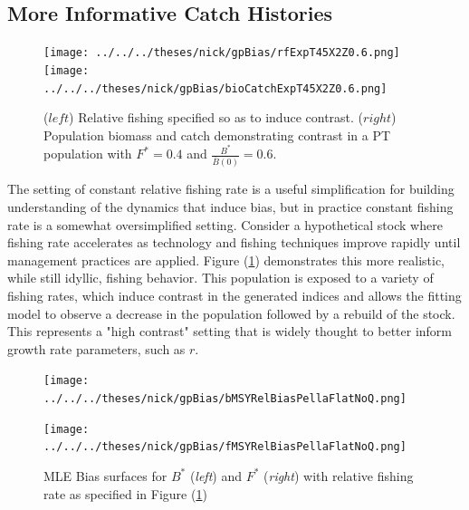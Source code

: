 \documentclass[12pt]{article}
\begin{document}
{%
\clearpage
\subsection{More Informative Catch Histories}

%
\begin{figure}[h!]
\texttt{[image: ../../../theses/nick/gpBias/rfExpT45X2Z0.6.png]}
\texttt{[image: ../../../theses/nick/gpBias/bioCatchExpT45X2Z0.6.png]}
\caption{ \label{expCatchT45}
($left$) Relative fishing specified so as to induce contrast.
($right$) Population biomass and catch demonstrating contrast in a PT population with $F^*=0.4$ and $\frac{B^*}{\bar B(0)}=0.6$.
}
\end{figure}

%
The setting of constant relative fishing rate is a useful simplification for 
building understanding of the dynamics that induce bias, but in practice constant 
fishing rate is a somewhat oversimplified setting. %
Consider a hypothetical stock where fishing rate accelerates as technology 
and fishing techniques improve rapidly until management practices are applied. %
Figure (\ref{expCatchT45}) demonstrates this more realistic, while still idyllic, %
fishing behavior. This population is exposed to a variety of fishing rates, 
which induce contrast in the generated indices and allows the fitting model to 
observe a decrease in the population followed by a rebuild of the stock. 
This represents a "high contrast" setting that is widely thought to better inform growth rate 
parameters, such as $r$.  

\begin{figure}[h!]
\vspace{-1cm}
\begin{minipage}[h!]{0.49\textwidth}
\texttt{[image: ../../../theses/nick/gpBias/bMSYRelBiasPellaFlatNoQ.png]}
\end{minipage}
\begin{minipage}[h!]{0.49\textwidth}
\texttt{[image: ../../../theses/nick/gpBias/fMSYRelBiasPellaFlatNoQ.png]}
\end{minipage}
\caption{ \label{expT45BmFm} 
MLE Bias surfaces for $B^*$ (\emph{left}) and $F^*$ (\emph{right}) with relative fishing rate as specified in Figure ({\ref{expCatchT45}})
}
\end{figure}

}
\end{document}
